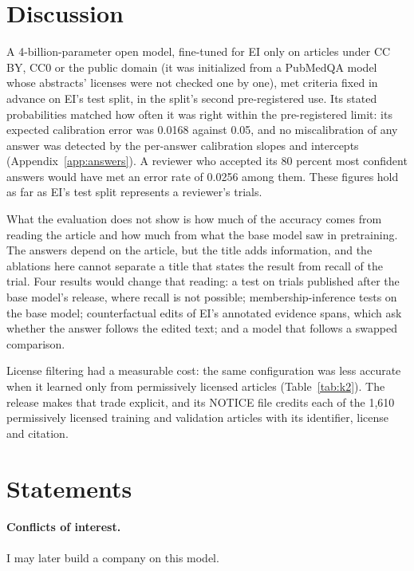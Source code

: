 \documentclass[11pt,letterpaper]{article}
\begin{document}
\section{Discussion}
\label{sec:discussion}

A 4-billion-parameter open model, fine-tuned for EI only on articles under CC BY, CC0 or the public domain (it was initialized from a PubMedQA model whose abstracts' licenses were not checked one by one), met criteria fixed in advance on EI's test split, in the split's second pre-registered use. Its stated probabilities matched how often it was right within the pre-registered limit: its expected calibration error was 0.0168 against 0.05, and no miscalibration of any answer was detected by the per-answer calibration slopes and intercepts (Appendix~\ref{app:answers}). A reviewer who accepted its 80 percent most confident answers would have met an error rate of 0.0256 among them. These figures hold as far as EI's test split represents a reviewer's trials.

What the evaluation does not show is how much of the accuracy comes from reading the article and how much from what the base model saw in pretraining. The answers depend on the article, but the title adds information, and the ablations here cannot separate a title that states the result from recall of the trial. Four results would change that reading: a test on trials published after the base model's release, where recall is not possible; membership-inference tests on the base model; counterfactual edits of EI's annotated evidence spans, which ask whether the answer follows the edited text; and a model that follows a swapped comparison.

License filtering had a measurable cost: the same configuration was less accurate when it learned only from permissively licensed articles (Table~\ref{tab:k2}). The release makes that trade explicit, and its NOTICE file credits each of the 1,610 permissively licensed training and validation articles with its identifier, license and citation.

\section*{Statements}
\label{sec:statements}

\paragraph{Conflicts of interest.} I may later build a company on this model.
\end{document}
